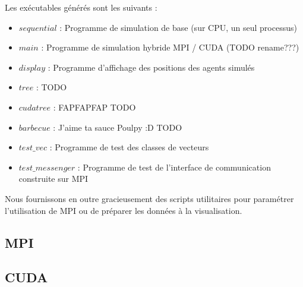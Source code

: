 \documentclass[12pt,a4paper,sans]{article}
\begin{document}
Les exécutables générés sont les suivants :
\begin{itemize}
    \item $sequential$ : Programme de simulation de base (sur CPU, un seul processus)
    \item $main$ : Programme de simulation hybride MPI / CUDA (TODO rename???)
    \item $display$ : Programme d'affichage des positions des agents simulés
    \item $tree$ : TODO
    \item $cuda tree$ : FAPFAPFAP TODO
    \item $barbecue$ : J'aime ta sauce Poulpy :D TODO
    \item $test\_vec$ : Programme de test des classes de vecteurs
    \item $test\_messenger$ : Programme de test de l'interface de communication construite sur MPI
\end{itemize}

Nous fournissons en outre gracieusement des scripts utilitaires pour paramétrer l'utilisation de MPI ou de préparer les données à la visualisation.

\subsection{MPI}

\subsection{CUDA}
\end{document}
